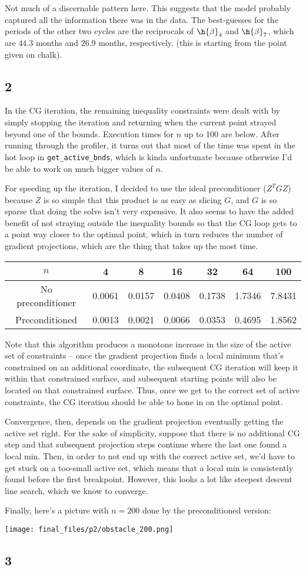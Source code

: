 \documentclass{article}
\begin{document}
Not much of a discernable pattern here. This suggests that the model probably captured all the information there was in the data. The best-guesses for the periods of the other two cycles are the reciprocals of $\h{\beta}_4$ and $\h{\beta}_7$, which are $44.3$ months and $26.9$ months, respectively. (this is starting from the point given on chalk).
\subsection*{2}
In the CG iteration, the remaining inequality constraints were dealt with by simply stopping the iteration and returning when the current point strayed beyond one of the bounds. Execution times for $n$ up to 100 are below. After running through the profiler, it turns out that most of the time was spent in the hot loop in \verb|get_active_bnds|, which is kinda unfortunate because otherwise I'd be able to work on much bigger values of $n$. 

For speeding up the iteration, I decided to use the ideal preconditioner ($Z^TGZ$) because $Z$ is so simple that this product is as easy as slicing $G$, and $G$ is so sparse that doing the solve isn't very expensive. It also seems to have the added benefit of not straying outside the inequality bounds so that the CG loop gets to a point way closer to the optimal point, which in turn reduces the number of gradient projections, which are the thing that takes up the most time.

\begin{tabular}{c|cccccc}
    $n$&4&8&16&32&64&100\\
    \hline
    No preconditioner&0.0061&0.0157&0.0408&0.1738&1.7346&7.8431\\
    \hline
    Preconditioned&0.0013&0.0021&0.0066&0.0353&0.4695&1.8562\\
\end{tabular}

Note that this algorithm produces a monotone increase in the size of the active set of constraints -- once the gradient projection finds a local minimum that's constrained on an additional coordinate, the subsequent CG iteration will keep it within that constrained surface, and subsequent starting points will also be located on that constrained surface. Thus, once we get to the correct set of active constraints, the CG iteration should be able to hone in on the optimal point. 

Convergence, then, depends on the gradient projection eventually getting the active set right. For the sake of simplicity, suppose that there is no additional CG step and that subsequent projection steps continue where the last one found a local min. Then, in order to not end up with the correct active set, we'd have to get stuck on a too-small active set, which means that a local min is consistently found before the first breakpoint. However, this looks a lot like steepest descent line search, which we know to converge.

Finally, here's a picture with $n=200$ done by the preconditioned version:

\texttt{[image: final\_files/p2/obstacle\_200.png]}
\subsection*{3}
\end{document}
